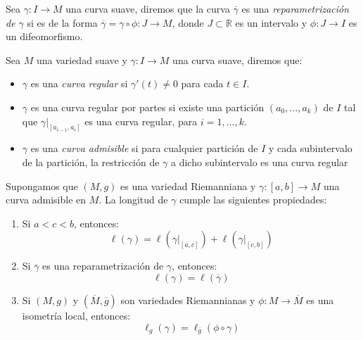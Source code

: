 \begin{definition}
	Sea $\gamma: I \to M$ una curva suave, diremos que la curva $\overline{\gamma}$ es una \textit{reparametrización de $\gamma$} si es de la forma $\overline{\gamma} = \gamma \circ \phi : J \to M$, donde $J \subset \mathbb{R}$ es un intervalo y $\phi: J \to I$ es un difeomorfismo.
\end{definition}

\begin{definition}
	Sea $M$ una variedad suave y $\gamma: I \to M$ una curva suave, diremos que:
	\begin{itemize}
		\item $\gamma$ es una \textit{curva regular} si $\gamma'(t) \neq 0$ para cada $t \in I$.
		\item $\gamma$ es una curva regular por partes si existe una partición $(a_0, \ldots, a_k)$ de $I$ tal que $\gamma|_{[a_{i-1},a_i]}$ es una curva regular, para $i=1, \ldots, k$.
		\item $\gamma$ es una \textit{curva admisible} si para cualquier partición de $I$ y cada subintervalo de la partición, la restricción de $\gamma$ a dicho subintervalo es una curva regular
	\end{itemize}
\end{definition}

\begin{lemma}
	Supongamos que $(M,g)$ es una variedad Riemanniana y $\gamma: [a,b] \to M$ una curva admisible en $M$. La longitud de $\gamma$ cumple las siguientes propiedades:
	\begin{enumerate}
		\item Si $a < c < b$, entonces:
		      \[
			      \ell(\gamma) = \ell(\gamma|_{[a,c]}) + \ell(\gamma|_{[c,b]})
		      \]
		\item Si $\overline{\gamma}$ es una reparametrización de $\gamma$, entonces:
		      \[
			      \ell(\gamma) = \ell(\overline{\gamma})
		      \]
		\item Si $(M,g)$ y $(\overline{M}, \overline{g})$ son variedades Riemannianas y $\phi: M \to \overline{M}$ es una isometría local, entonces:
		      \[
			      \ell_{g}(\gamma) = \ell_{\overline{g}}(\phi \circ \gamma)
		      \]
	\end{enumerate}
\end{lemma}

